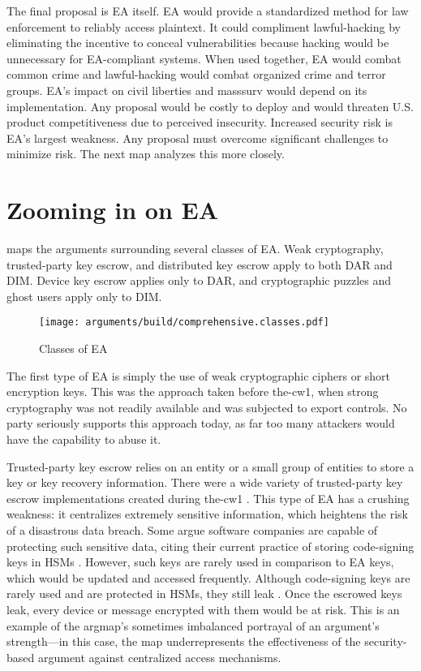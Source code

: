 The final proposal is \ac{EA} itself. \ac{EA} would provide a standardized method for law enforcement to reliably access
\ac{plaintext}. It could compliment \ac{lawful-hacking} by eliminating the incentive to conceal vulnerabilities because
hacking would be unnecessary for \ac{EA}-compliant systems. When used together, \ac{EA} would combat common crime and
\ac{lawful-hacking} would combat organized crime and terror groups. \Ac{EA}'s impact on civil liberties and
\ac{masssurv} would depend on its implementation. Any proposal would be costly to deploy and would threaten U.S. product
competitiveness due to perceived insecurity. Increased security risk is \ac{EA}'s largest weakness. Any proposal must
overcome significant challenges to minimize risk. The next map analyzes this more closely.


\section{Zooming in on EA}
\label{sec-ea-types}

 maps the arguments surrounding several classes of \ac{EA}. Weak cryptography, trusted-party key
escrow, and distributed key escrow apply to both \ac{DAR} and \ac{DIM}. Device key escrow applies only to \ac{DAR}, and
cryptographic puzzles and ghost users apply only to \ac{DIM}.

\begin{sidewaysfigure}[p!]
  \centering\CaptionFontSize
  \texttt{[image: arguments/build/comprehensive.classes.pdf]}
  \caption{Classes of EA}
  \label{fig-arg-classes}
\end{sidewaysfigure}

The first type of \ac{EA} is simply the use of weak cryptographic ciphers or short encryption keys. This was the
approach taken before \ac{the-cw1}, when strong cryptography was not readily available and was subjected to export
controls. No party seriously supports this approach today, as far too many attackers would have the capability to abuse
it.

Trusted-party key escrow relies on an entity or a small group of entities to store a key or key recovery information.
There were a wide variety of trusted-party key escrow implementations created during \ac{the-cw1}
\cite{denning_taxonomy_1996}. This type of \ac{EA} has a crushing weakness: it centralizes extremely sensitive
information, which heightens the risk of a disastrous data breach. Some argue software companies are capable of
protecting such sensitive data, citing their current practice of storing code-signing keys in \acp{HSM}
\cite{ozzie_2018}. However, such keys are rarely used in comparison to \ac{EA} keys, which would be updated and accessed
frequently. Although code-signing keys are rarely used and are protected in \acp{HSM}, they still leak
\cite{green_2018}. Once the escrowed keys leak, every device or message encrypted with them would be at risk. This is an
example of the \ac{argmap}'s sometimes imbalanced portrayal of an argument's strength---in this case, the map
underrepresents the effectiveness of the security-based argument against centralized access mechanisms.

